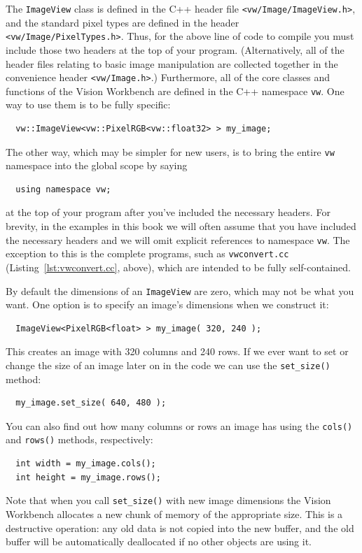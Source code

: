 The \verb#ImageView# class is defined in the C++ header file
\verb#<vw/Image/ImageView.h>#, and the standard pixel types are
defined in the header \verb#<vw/Image/PixelTypes.h>#.  Thus, for the
above line of code to compile you must include those two headers at
the top of your program.  (Alternatively, all of the header files
relating to basic image manipulation are collected together in the
convenience header \verb#<vw/Image.h>#.)  Furthermore, all of the core
classes and functions of the Vision Workbench are defined in the C++
namespace \verb#vw#.  One way to use them is to be fully specific:
\begin{verbatim}
  vw::ImageView<vw::PixelRGB<vw::float32> > my_image;
\end{verbatim}
The other way, which may be simpler for new users, is to bring the 
entire \verb#vw# namespace into the global scope by saying 
\begin{verbatim}
  using namespace vw;
\end{verbatim}
at the top of your program after you've included the necessary
headers.  For brevity, in the examples in this book we will often
assume that you have included the necessary headers and we will omit
explicit references to namespace \verb#vw#.  The exception to this is
the complete programs, such as \verb#vwconvert.cc#
(Listing~\ref{lst:vwconvert.cc}, above), which are intended to be
fully self-contained.

By default the dimensions of an \verb#ImageView# are zero, which may not 
be what you want.  One option is to specify an image's dimensions when 
we construct it:
\begin{verbatim}
  ImageView<PixelRGB<float> > my_image( 320, 240 );
\end{verbatim}
This creates an image with 320 columns and 240 rows.  If we ever want to 
set or change the size of an image later on in the code we can use the 
\verb#set_size()# method:
\begin{verbatim}
  my_image.set_size( 640, 480 );
\end{verbatim}
You can also find out how many columns or rows an image has using the 
\verb#cols()# and \verb#rows()# methods, respectively:
\begin{verbatim}
  int width = my_image.cols();
  int height = my_image.rows();
\end{verbatim}
Note that when you call \verb#set_size()# with new image dimensions
the Vision Workbench allocates a new chunk of memory of the
appropriate size.  This is a destructive operation: any old data is
not copied into the new buffer, and the old buffer will be
automatically deallocated if no other objects are using it.

